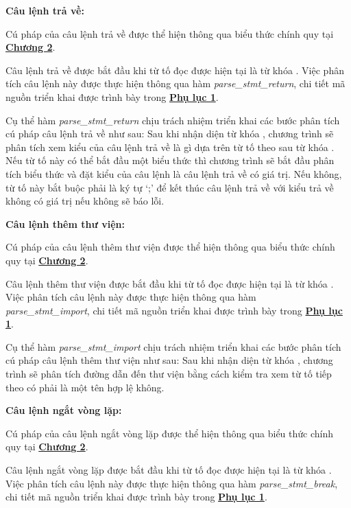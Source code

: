 \textbf{Câu lệnh trả về:}

Cú pháp của câu lệnh trả về được thể hiện thông qua biểu thức chính quy tại \hyperref[ch2:block_stmt]{\bf Chương 2}.

Câu lệnh trả về được bắt đầu khi từ tố đọc được hiện tại là từ khóa . Việc phân tích câu lệnh này được thực hiện thông qua hàm \textit{parse\_stmt\_return}, chi tiết mã nguồn triển khai được trình bày trong \hyperref[ap1:stmtyeet]{\bf Phụ lục 1}. %

Cụ thể hàm \textit{parse\_stmt\_return} chịu trách nhiệm triển khai các bước phân tích cú pháp câu lệnh trả về như sau: 
Sau khi nhận diện từ khóa , chương trình sẽ phân tích xem kiểu của câu lệnh trả về là gì dựa trên từ tố theo sau từ khóa . Nếu từ tố này có thể bắt đầu một biểu thức thì chương trình sẽ bắt đầu phân tích biểu thức và đặt kiểu của câu lệnh là câu lệnh trả về có giá trị. Nếu không, từ tố này bắt buộc phải là ký tự `;' để kết thúc câu lệnh trả về với kiểu trả về không có giá trị nếu không sẽ báo lỗi.

\textbf{Câu lệnh thêm thư viện:}

Cú pháp của câu lệnh thêm thư viện được thể hiện thông qua biểu thức chính quy tại \hyperref[ch2:block_stmt]{\bf Chương 2}.

Câu lệnh thêm thư viện được bắt đầu khi từ tố đọc được hiện tại là từ khóa . Việc phân tích câu lệnh này được thực hiện thông qua hàm \\\textit{parse\_stmt\_import}, chi tiết mã nguồn triển khai được trình bày trong \hyperref[ap1:stmtadd]{\bf Phụ lục 1}. %

Cụ thể hàm \textit{parse\_stmt\_import} chịu trách nhiệm triển khai các bước phân tích cú pháp câu lệnh thêm thư viện như sau: 
Sau khi nhận diện từ khóa , chương trình sẽ phân tích đường dẫn đến thư viện bằng cách kiểm tra xem từ tố tiếp theo có phải là một tên hợp lệ không.

\textbf{Câu lệnh ngắt vòng lặp:}

Cú pháp của câu lệnh ngắt vòng lặp được thể hiện thông qua biểu thức chính quy tại \hyperref[ch2:block_stmt]{\bf Chương 2}.

Câu lệnh ngắt vòng lặp được bắt đầu khi từ tố đọc được hiện tại là từ khóa . Việc phân tích câu lệnh này được thực hiện thông qua hàm \textit{parse\_stmt\_break}, chi tiết mã nguồn triển khai được trình bày trong \hyperref[ap1:stmtbr]{\bf Phụ lục 1}. %

